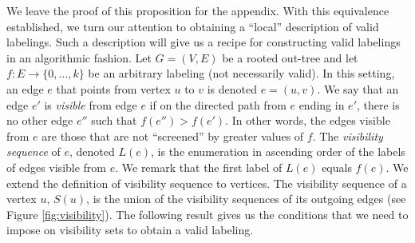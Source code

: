 \documentclass[11pt]{article}
\newcommand\+{\mkern2mu}
\begin{document}
We leave the proof of this proposition for the appendix. With this equivalence established, we turn our attention to obtaining a ``local'' description of valid labelings. Such a description will give us a recipe for constructing valid labelings in an algorithmic fashion. Let $G=(V, E)$ be a rooted out-tree and let $f:E \to \{0, \ldots, k\}$ be an arbitrary labeling (not necessarily valid). In this setting, an edge $e$ that points from vertex $u$ to $v$ is denoted $e=(u, v)$. We say that an edge $e'$ is \emph{visible} from edge $e$ if on the directed path from $e$ ending in $e'$, there is no other edge $e''$ such that $f(e'') > f(e')$. In other words, the edges visible from $e$ are those that are not ``screened'' by greater values of $f$. The \emph{visibility sequence} of $e$, denoted $L(e)$, is the enumeration in ascending order of the labels of edges visible from $e$. We remark that the first label of $L(e)$ equals $f(e)$. We extend the definition of visibility sequence to vertices. The visibility sequence of a vertex $u$, $S(u)$, is the union of the visibility sequences of its outgoing edges (see Figure \ref{fig:visibility}). The following result gives us the conditions that we need to impose on visibility sets to obtain a valid labeling.
\end{document}
